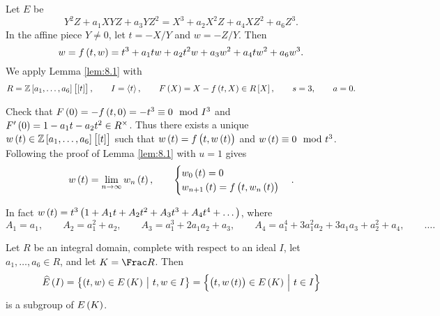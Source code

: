 Let $ E $ be
$$ Y^2Z + a_1XYZ + a_3YZ^2 = X^3 + a_2X^2Z + a_4XZ^2 + a_6Z^3. $$
In the affine piece $ Y \ne 0 $, let $ t = -X / Y $ and $ w = -Z / Y $. Then
$$ w = f\br{t, w} = t^3 + a_1tw + a_2t^2w + a_3w^2 + a_4tw^2 + a_6w^3. $$
We apply Lemma \ref{lem:8.1} with
$$ R = \ZZ\sbr{a_1, \dots, a_6}\sbr{\sbr{t}}, \qquad I = \abr{t}, \qquad F\br{X} = X - f\br{t, X} \in R\sbr{X}, \qquad s = 3, \qquad a = 0. $$

\pagebreak

Check that $ F\br{0} = -f\br{t, 0} = -t^3 \equiv 0 \mod I^3 $ and $ F'\br{0} = 1 - a_1t - a_2t^2 \in R^\times $. Thus there exists a unique $ w\br{t} \in \ZZ\sbr{a_1, \dots, a_6}\sbr{\sbr{t}} $ such that $ w\br{t} = f\br{t, w\br{t}} $ and $ w\br{t} \equiv 0 \mod t^3 $. Following the proof of Lemma \ref{lem:8.1} with $ u = 1 $ gives
$$ w\br{t} = \lim_{n \to \infty} w_n\br{t}, \qquad
\begin{cases}
w_0\br{t} = 0 \\
w_{n + 1}\br{t} = f\br{t, w_n\br{t}}
\end{cases}.
$$


In fact $ w\br{t} = t^3\br{1 + A_1t + A_2t^2 + A_3t^3 + A_4t^4 + \dots} $, where
$$ A_1 = a_1, \qquad A_2 = a_1^2 + a_2, \qquad A_3 = a_1^3 + 2a_1a_2 + a_3, \qquad A_4 = a_1^4 + 3a_1^2a_2 + 3a_1a_3 + a_2^2 + a_4, \qquad \dots. $$

\begin{lemma}
\label{lem:8.2}
Let $ R $ be an integral domain, complete with respect to an ideal $ I $, let $ a_1, \dots, a_6 \in R $, and let $ K = \Frac R $. Then
$$ \widehat{E}\br{I} = \cbr{\br{t, w} \in E\br{K} \st t, w \in I} = \cbr{\br{t, w\br{t}} \in E\br{K} \st t \in I} $$
is a subgroup of $ E\br{K} $.
\end{lemma}

